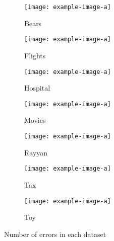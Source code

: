 \begin{figure}[!t]
    \centering 
    \centering
\begin{subfigure}{0.4\textwidth}
    \texttt{[image: example-image-a]}
    \caption{\label{exp:d1}Bears}
    \label{exp:barplot_error_count_bears}
\end{subfigure}
\hfill
\begin{subfigure}{0.4\textwidth}
    \texttt{[image: example-image-a]}
    \caption{Flights}
    \label{exp:barplot_error_count_flights}
\end{subfigure}
\hfill
\begin{subfigure}{0.4\textwidth}
    \texttt{[image: example-image-a]}
    \caption{Hospital}
    \label{fig:barplot_error_count_hospital}
\end{subfigure}
\hfill
\begin{subfigure}{0.4\textwidth}
    \texttt{[image: example-image-a]}
    \caption{Movies}
    \label{exp:barplot_error_count_movies}
\end{subfigure}
\hfill
\begin{subfigure}{0.4\textwidth}
    \texttt{[image: example-image-a]}
    \caption{Rayyan}
    \label{exp:barplot_error_count_rayyan}
\end{subfigure}
\hfill
\begin{subfigure}{0.4\textwidth}
    \texttt{[image: example-image-a]}
    \caption{Tax}
    \label{exp:distincts_tax}
\end{subfigure}
\hfill
\begin{subfigure}{0.4\textwidth}
    \texttt{[image: example-image-a]}
    \caption{Toy}
    \label{exp:barplot_error_count_toy}
\end{subfigure}
\caption{Number of errors in each dataset}
\label{exp:barplot_error_counts_datasets}
\end{figure}